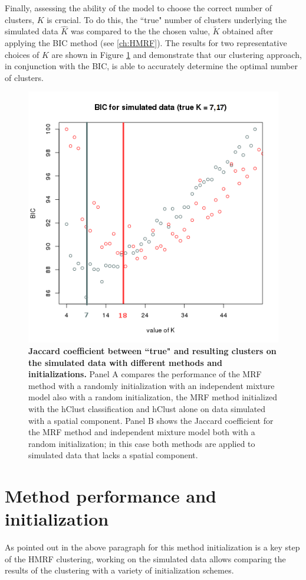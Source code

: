 Finally, assessing the ability of the model to choose the correct number of clusters, $K$ is crucial. To do this, the ``true" number of clusters underlying the simulated data $\hat{K}$ was compared to the the chosen value, $\widetilde{K}$ obtained after applying the BIC method (see \ref{ch:HMRF}). The results for two representative choices of $K$ are shown in Figure \ref{fig:simulatedK} and demonstrate that our clustering approach, in conjunction with the BIC, is able to accurately determine the optimal number of clusters.\\

	\begin{figure}[H]
\centerline{\includegraphics[width=0.6\linewidth]{gfx/chapter5/simulated_k.png}}
\caption{{\bf Jaccard coefficient between ``true" and resulting clusters on the simulated data with different methods and initializations.} Panel A compares the performance of the MRF method with a randomly initialization with an independent mixture model also with a random initialization, the MRF method initialized with the hClust classification and hClust alone on data simulated with a spatial component. Panel B shows the Jaccard coefficient for the MRF method and independent mixture model both with a random initialization; in this case both methods are applied to simulated data that lacks a spatial component.}
\label{fig:simulatedK}
	\end{figure}

\section{Method performance and initialization}\label{sec:method_comparison}
As pointed out in the above paragraph for this method initialization is a key step of the HMRF clustering, working on the simulated data allows comparing the results of the clustering with a variety of initialization schemes.
